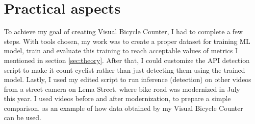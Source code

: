 \chapter{Practical aspects}
\label{cha:practicalAspects}

To achieve my goal of creating Visual Bicycle Counter, I had to complete a few steps. With tools chosen, my work was to create a proper dataset for training ML model, train and evaluate this training to reach acceptable values of metrics I mentioned in section \ref{sec:theory}. After that, I could customize the API detection script to make it count cyclist rather than just detecting them using the trained model. Lastly, I used my edited script to run inference (detection) on other videos from a street camera on Lema Street, where bike road was modernized in July this year. I used videos before and after modernization, to prepare a simple comparison, as an example of how data obtained by my Visual Bicycle Counter can be used.


